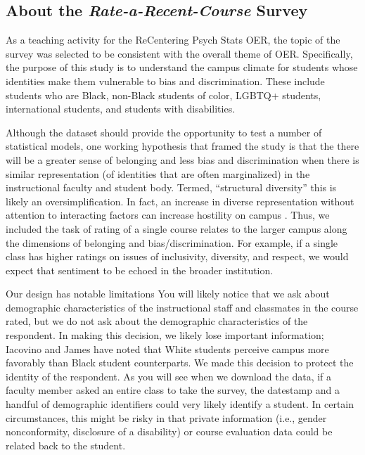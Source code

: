 \documentclass[
  11pt,
]{book}
\begin{document}
\hypertarget{about-the-rate-a-recent-course-survey}{%
\subsection{\texorpdfstring{About the \emph{Rate-a-Recent-Course} Survey}{About the Rate-a-Recent-Course Survey}}\label{about-the-rate-a-recent-course-survey}}

As a teaching activity for the ReCentering Psych Stats OER, the topic of the survey was selected to be consistent with the overall theme of OER. Specifically, the purpose of this study is to understand the campus climate for students whose identities make them vulnerable to bias and discrimination. These include students who are Black, non-Black students of color, LGBTQ+ students, international students, and students with disabilities.

Although the dataset should provide the opportunity to test a number of statistical models, one working hypothesis that framed the study is that the there will be a greater sense of belonging and less bias and discrimination when there is similar representation (of identities that are often marginalized) in the instructional faculty and student body. Termed, ``structural diversity'' \citep{lewis_black_2019} this is likely an oversimplification. In fact, an increase in diverse representation without attention to interacting factors can increase hostility on campus \citep{hurtado_linking_2007}. Thus, we included the task of rating of a single course relates to the larger campus along the dimensions of belonging and bias/discrimination. For example, if a single class has higher ratings on issues of inclusivity, diversity, and respect, we would expect that sentiment to be echoed in the broader institution.

Our design has notable limitations You will likely notice that we ask about demographic characteristics of the instructional staff and classmates in the course rated, but we do not ask about the demographic characteristics of the respondent. In making this decision, we likely lose important information; Iacovino and James \citeyearpar{iacovino_retaining_2016} have noted that White students perceive campus more favorably than Black student counterparts. We made this decision to protect the identity of the respondent. As you will see when we download the data, if a faculty member asked an entire class to take the survey, the datestamp and a handful of demographic identifiers could very likely identify a student. In certain circumstances, this might be risky in that private information (i.e., gender nonconformity, disclosure of a disability) or course evaluation data could be related back to the student.
\end{document}
